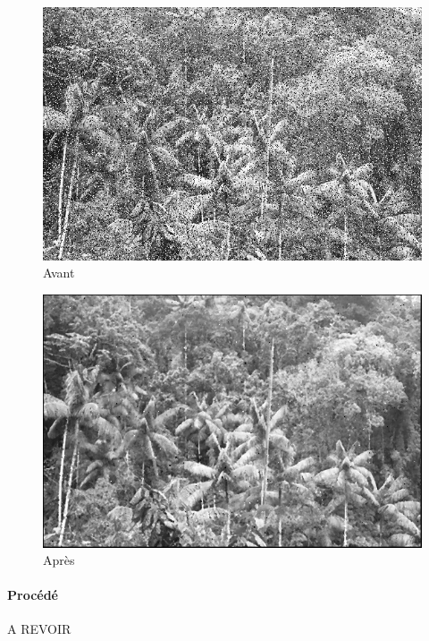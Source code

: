 	\begin{figure}[h]
	\centering
		\begin{multicols}{2}
		\includegraphics[scale=0.45]{images/Gliese_581d-V2.png}
		Avant

		\includegraphics[scale=0.45]{images/MissionX2v2.png}
		Après
		\end{multicols}
	\end{figure}
	\vspace{-0.9cm}

	\paragraph{Procédé}
	\begin{center}
	{\Huge\color{red}A REVOIR}
	\end{center}